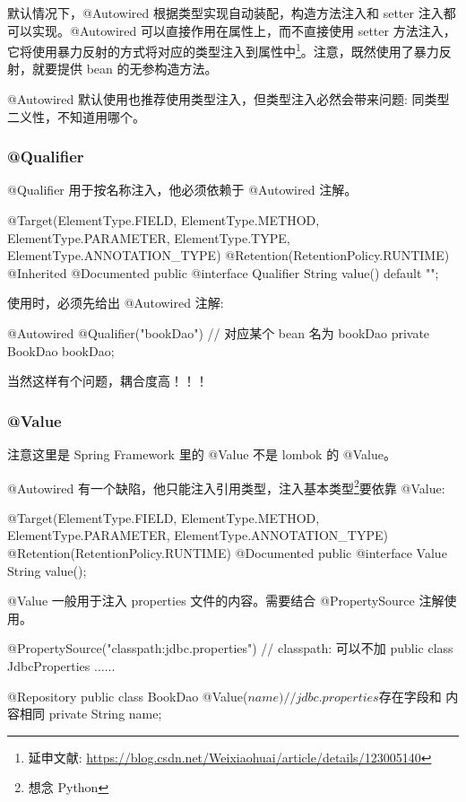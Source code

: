 默认情况下，@Autowired 根据类型实现自动装配，构造方法注入和 setter 注入都可以实现。@Autowired 可以直接作用在属性上，而不直接使用 setter 方法注入，它将使用暴力反射的方式将对应的类型注入到属性中\footnote{延申文献: \url{https://blog.csdn.net/Weixiaohuai/article/details/123005140}}。注意，既然使用了暴力反射，就要提供 bean 的无参构造方法。

@Autowired 默认使用也推荐使用类型注入，但类型注入必然会带来问题: 同类型二义性，不知道用哪个。

\subsubsection{@Qualifier}

@Qualifier 用于按名称注入，他必须依赖于 @Autowired 注解。

\begin{Java}
@Target({ElementType.FIELD, ElementType.METHOD, ElementType.PARAMETER, ElementType.TYPE, ElementType.ANNOTATION_TYPE})
@Retention(RetentionPolicy.RUNTIME)
@Inherited
@Documented
public @interface Qualifier {
    String value() default "";
}
\end{Java}

使用时，必须先给出 @Autowired 注解:

\begin{Java}
@Autowired
@Qualifier("bookDao")   // 对应某个 bean 名为 bookDao
private BookDao bookDao;
\end{Java}

当然这样有个问题，耦合度高！！！

\subsubsection{@Value}

注意这里是 Spring Framework 里的 @Value 不是 lombok 的 @Value。

@Autowired 有一个缺陷，他只能注入引用类型，注入基本类型\footnote{想念 Python}要依靠 @Value:

\begin{Java}
@Target({ElementType.FIELD, ElementType.METHOD, ElementType.PARAMETER, ElementType.ANNOTATION_TYPE})
@Retention(RetentionPolicy.RUNTIME)
@Documented
public @interface Value {
    String value();
}
\end{Java}

@Value 一般用于注入 properties 文件的内容。需要结合 @PropertySource 注解使用。

\begin{Java}
@PropertySource("classpath:jdbc.properties")    // classpath: 可以不加
public class JdbcProperties {
    ......
}

@Repository
public class BookDao {
    @Value(${name})     // jdbc.properties 存在字段和 ${} 内容相同
    private String name;
}
\end{Java}

